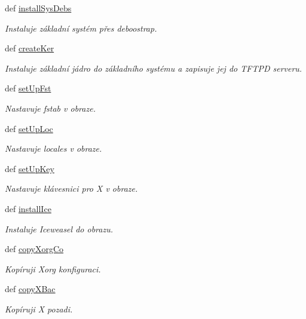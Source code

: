 \begin{DoxyCompactItemize}
def \hyperlink{classConfSys_1_1ConfSys_a25b558cfd4ac44f9f75d82771079db7a}{install\-Sys\-Debs}
\begin{DoxyCompactList}\small\item\em Instaluje základní systém přes deboostrap. \end{DoxyCompactList}\item 
def \hyperlink{classConfSys_1_1ConfSys_a8b17a236bdf36c53b109b0d30add20a3}{create\-Ker}
\begin{DoxyCompactList}\small\item\em Instaluje základní jádro do základního systému a zapisuje jej do T\-F\-T\-P\-D serveru. \end{DoxyCompactList}\item 
def \hyperlink{classConfSys_1_1ConfSys_ab30f940b6063d918726bf098a1572dbd}{set\-Up\-Fst}
\begin{DoxyCompactList}\small\item\em Nastavuje fstab v obraze. \end{DoxyCompactList}\item 
def \hyperlink{classConfSys_1_1ConfSys_ad2121d426e037b6ad07d747231fe6370}{set\-Up\-Loc}
\begin{DoxyCompactList}\small\item\em Nastavuje locales v obraze. \end{DoxyCompactList}\item 
def \hyperlink{classConfSys_1_1ConfSys_a6cd13575cfed138a3fa2fdeecc567000}{set\-Up\-Key}
\begin{DoxyCompactList}\small\item\em Nastavuje klávesnici pro X v obraze. \end{DoxyCompactList}\item 
def \hyperlink{classConfSys_1_1ConfSys_a75c24373b7f98875cb36979db32affb6}{install\-Ice}
\begin{DoxyCompactList}\small\item\em Instaluje Iceweasel do obrazu. \end{DoxyCompactList}\item 
def \hyperlink{classConfSys_1_1ConfSys_ac1ae7ecf353bc1fd45635bdca5d7b3bc}{copy\-Xorg\-Co}
\begin{DoxyCompactList}\small\item\em Kopíruji Xorg konfiguraci. \end{DoxyCompactList}\item 
def \hyperlink{classConfSys_1_1ConfSys_a56c578bb874bfb2b0b3da19361ddf84b}{copy\-X\-Bac}
\begin{DoxyCompactList}\small\item\em Kopíruji X pozadi. \end{DoxyCompactList}\end{DoxyCompactItemize}
